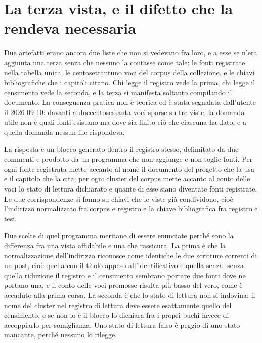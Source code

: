 \section{La terza vista, e il difetto che la rendeva necessaria}

Due artefatti erano ancora due liste che non si vedevano fra loro, e a esse se n'era aggiunta una terza senza che nessuno la contasse come tale: le fonti registrate nella tabella unica, le centosettantuno voci del corpus della collezione, e le chiavi bibliografiche che i capitoli citano. Chi legge il registro vede la prima, chi legge il censimento vede la seconda, e la terza si manifesta soltanto compilando il documento. La conseguenza pratica non è teorica ed è stata segnalata dall'utente il 2026-09-10: davanti a duecentosessanta voci sparse su tre viste, la domanda utile non è quali fonti esistano ma dove sia finito ciò che ciascuna ha dato, e a quella domanda nessun file rispondeva.

La risposta è un blocco generato dentro il registro stesso, delimitato da due commenti e prodotto da un programma che non aggiunge e non toglie fonti. Per ogni fonte registrata mette accanto al nome il documento del progetto che la usa e il capitolo che la cita; per ogni cluster del corpus mette accanto al conto delle voci lo stato di lettura dichiarato e quante di esse siano diventate fonti registrate. Le due corrispondenze si fanno su chiavi che le viste già condividono, cioè l'indirizzo normalizzato fra corpus e registro e la chiave bibliografica fra registro e tesi.

Due scelte di quel programma meritano di essere enunciate perché sono la differenza fra una vista affidabile e una che rassicura. La prima è che la normalizzazione dell'indirizzo riconosce come identiche le due scritture correnti di un post, cioè quella con il titolo appeso all'identificativo e quella senza: senza quella riduzione il registro e il censimento sembrano portare due fonti dove ne portano una, e il conto delle voci promosse risulta più basso del vero, come è accaduto alla prima corsa. La seconda è che lo stato di lettura non si indovina: il nome del cluster nel registro di lettura deve essere esattamente quello del censimento, e se non lo è il blocco lo dichiara fra i propri buchi invece di accoppiarlo per somiglianza. Uno stato di lettura falso è peggio di uno stato mancante, perché nessuno lo rilegge.
